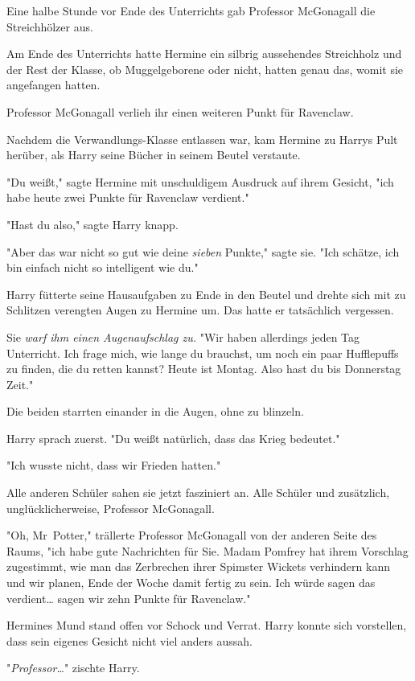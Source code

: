 {Eine halbe Stunde vor Ende des Unterrichts gab Professor McGonagall die Streichhölzer aus.

Am Ende des Unterrichts hatte Hermine ein silbrig aussehendes Streichholz und der Rest der Klasse, ob Muggelgeborene oder nicht, hatten genau das, womit sie angefangen hatten.

Professor McGonagall verlieh ihr einen weiteren Punkt für Ravenclaw.

\later

Nachdem die Verwandlungs-Klasse entlassen war, kam Hermine zu Harrys Pult herüber, als Harry seine Bücher in seinem Beutel verstaute.

"Du weißt," sagte Hermine mit unschuldigem Ausdruck auf ihrem Gesicht, "ich habe heute zwei Punkte für Ravenclaw verdient."

"Hast du also," sagte Harry knapp.

"Aber das war nicht so gut wie deine \emph{sieben} Punkte," sagte sie. "Ich schätze, ich bin einfach nicht so intelligent wie du."

Harry fütterte seine Hausaufgaben zu Ende in den Beutel und drehte sich mit zu Schlitzen verengten Augen zu Hermine um. Das hatte er tatsächlich vergessen.

Sie \emph{warf ihm einen Augenaufschlag zu.} "Wir haben allerdings jeden Tag Unterricht. Ich frage mich, wie lange du brauchst, um noch ein paar Hufflepuffs zu finden, die du retten kannst? Heute ist Montag. Also hast du bis Donnerstag Zeit."

Die beiden starrten einander in die Augen, ohne zu blinzeln.

Harry sprach zuerst. "Du weißt natürlich, dass das Krieg bedeutet."

"Ich wusste nicht, dass wir Frieden hatten."

Alle anderen Schüler sahen sie jetzt fasziniert an. Alle Schüler und zusätzlich, unglücklicherweise, Professor McGonagall.

"Oh, Mr~Potter," trällerte Professor McGonagall von der anderen Seite des Raums, "ich habe gute Nachrichten für Sie. Madam Pomfrey hat ihrem Vorschlag zugestimmt, wie man das Zerbrechen ihrer Spimster Wickets verhindern kann und wir planen, Ende der Woche damit fertig zu sein. Ich würde sagen das verdient… sagen wir zehn Punkte für Ravenclaw."

Hermines Mund stand offen vor Schock und Verrat. Harry konnte sich vorstellen, dass sein eigenes Gesicht nicht viel anders aussah.

"\emph{Professor…}" zischte Harry.

}
